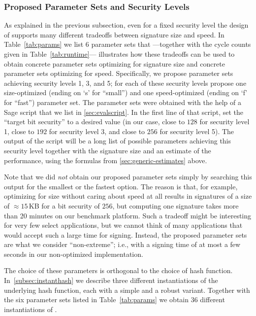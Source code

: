 \subsubsection{Proposed Parameter Sets and Security Levels}
As explained in the previous subsection,
even for a fixed security level the design of \spx supports many different
tradeoffs between signature size and speed. In Table~\ref{tab:params} we list
6 parameter sets that%
---together with the cycle counts given in Table~\ref{tab:runtime}---
illustrates how these tradeoffs can be used to obtain concrete parameter sets
optimizing for signature size and concrete parameter sets optimizing for speed.
Specifically, we propose parameter sets achieving security levels 1, 3, and 5;
for each of these security levels propose one size-optimized (ending on `s'
for ``small'') and one speed-optimized (ending on `f' for ``fast'') parameter
set. The parameter sets were obtained with the help of a Sage script that
we list in \autoref{sec:evalscript}. In the first line of that script,
set the ``target bit security'' to a desired value (in our case, close to
$128$ for security level 1, close to $192$ for security level 3, and close to $256$
for security level 5). The output of the script will be a long list of possible
parameters achieving this security level together with the signature size and
an estimate of the performance, using the formulas from
\autoref{sec:generic-estimates} above.

Note that we did \emph{not} obtain our proposed parameter sets simply by searching
this output for the smallest or the fastest option. The reason is that, for example,
optimizing for size without caring about speed at all results in signatures of
a size of $\approx15$\,KB for a bit security of $256$, but computing one signature
takes more than 20 minutes on our benchmark platform. Such a tradeoff might be
interesting for very few select applications, but we cannot think of many applications
that would accept such a large time for signing. Instead, the proposed parameter
sets are what we consider ``non-extreme''; i.e., with a signing time of at most
a few seconds in our non-optimized implementation.

The choice of these parameters is orthogonal to the choice of hash function.
In~\autoref{subsec:instanthash} we describe three different instantiations
of the underlying hash function, each with a simple and a robust variant.
Together with the six parameter sets listed in
Table~\ref{tab:params} we obtain 36 different instantiations of \spx.

